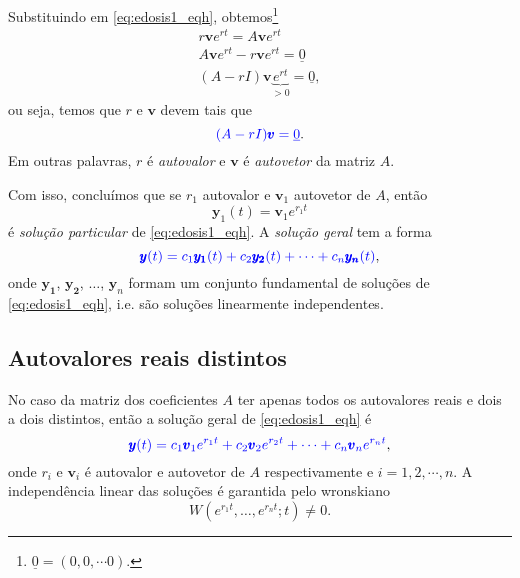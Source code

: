 Substituindo em \eqref{eq:edosis1_eqh}, obtemos\footnote{$\underline{0} = (0, 0, \cdots 0)$.}
\begin{gather}
  r\pmb{v}e^{rt} = A\pmb{v}e^{rt} \\
  A\pmb{v}e^{rt} - r\pmb{v}e^{rt} = \underline{0} \\
  (A - rI)\pmb{v}\underbrace{e^{rt}}_{>0} = \underline{0},
\end{gather}
ou seja, temos que $r$ e $\pmb{v}$ devem tais que
\begin{equation}\label{eq:edosis1_eqc}
  {\color{blue}(A - rI)\pmb{v} = \underline{0}}.
\end{equation}
Em outras palavras, $r$ é \emph{autovalor} e $\pmb{v}$ é \emph{autovetor} da matriz $A$.

Com isso, concluímos que se $r_1$ autovalor e $\pmb{v}_1$ autovetor de $A$, então
\begin{equation}
  \pmb{y}_1(t) = \pmb{v}_1e^{r_1t}
\end{equation}
é \emph{solução particular} de \eqref{eq:edosis1_eqh}. A \emph{solução geral} tem a forma
\begin{equation}
  {\color{blue}\pmb{y}(t) = c_1\pmb{y_1}(t) + c_2\pmb{y_2}(t) + \cdots + c_n\pmb{y_n}(t)},
\end{equation}
onde $\pmb{y_1}$, $\pmb{y_2}$, $\dotsc$, $\pmb{y}_n$ formam um conjunto fundamental de soluções de \eqref{eq:edosis1_eqh}, i.e. são soluções linearmente independentes.

\subsection{Autovalores reais distintos}

No caso da matriz dos coeficientes $A$ ter apenas todos os autovalores reais e dois a dois distintos, então a solução geral de \eqref{eq:edosis1_eqh} é
\begin{equation}
  {\color{blue}\pmb{y}(t) = c_1\pmb{v}_1e^{r_1t}+c_2\pmb{v}_2e^{r_2t}+\cdots + c_n\pmb{v}_ne^{r_nt}},
\end{equation}
onde $r_i$ e $\pmb{v}_i$ é autovalor e autovetor de $A$ respectivamente e $i=1, 2, \cdots, n$. A independência linear das soluções é garantida pelo wronskiano
\begin{equation}
  W(e^{r_1t}, \dotsc, e^{r_nt};t)\neq 0.
\end{equation}

